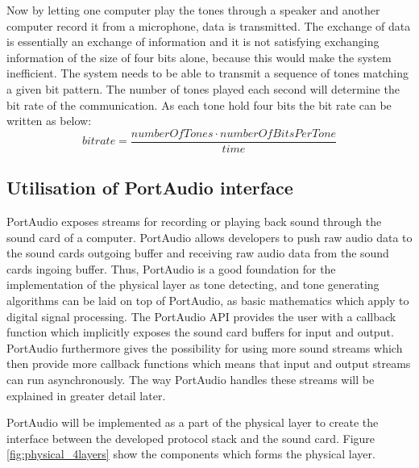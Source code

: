 	Now by letting one computer play the tones through a speaker and another computer record it from
	a microphone, data is transmitted. The exchange of data is essentially an exchange
	of information and it is not satisfying exchanging information of the size of four bits alone,
	because this would make the system inefficient. The system needs to be able to transmit a sequence
	of tones matching a given bit pattern. The number of tones played each second will determine the
	bit rate of the communication. As each tone hold four bits the bit rate can be written as below:
	\begin{equation}bitrate = \frac{numberOfTones \cdot numberOfBitsPerTone}{time}\end{equation}
	
	\subsection{Utilisation of PortAudio interface}
	PortAudio exposes streams for recording or playing back sound through the sound card of a
	computer. PortAudio allows developers to push raw audio data to the sound cards outgoing buffer and
	receiving raw audio data from the sound cards ingoing buffer. Thus, PortAudio is a good foundation for the
	implementation of the physical layer as tone detecting, and tone generating algorithms can be laid on top
	of PortAudio, as basic mathematics which apply to digital signal processing. The PortAudio API provides the
	user with a callback function which implicitly exposes the sound card buffers for input and output. PortAudio
	furthermore gives the possibility for using more sound streams which then provide more callback functions
	which means that input and output streams can run asynchronously. The way PortAudio handles these streams
	will be explained in greater detail later.
	
	PortAudio will be implemented as a part of the physical layer to create the interface between the developed
	protocol stack and the sound card. Figure \ref{fig:physical_4layers} show the components which forms the physical layer. 
	
